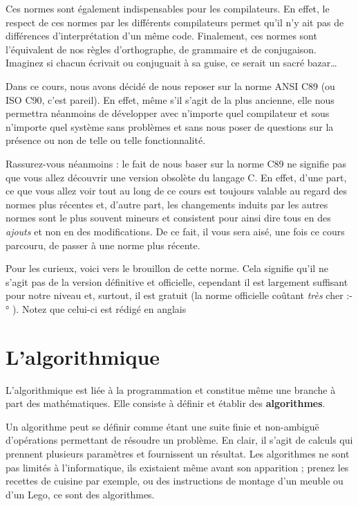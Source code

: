 Ces normes sont également indispensables pour les compilateurs. En
effet, le respect de ces normes par les différents compilateurs permet
qu'il n'y ait pas de différences d'interprétation d'un même code.
Finalement, ces normes sont l'équivalent de nos règles d'orthographe, de
grammaire et de conjugaison. Imaginez si chacun écrivait ou conjuguait à
sa guise, ce serait un sacré bazar\ldots{}

Dans ce cours, nous avons décidé de nous reposer sur la norme ANSI C89
(ou ISO C90, c'est pareil). En effet, même s'il s'agit de la plus
ancienne, elle nous permettra néanmoins de développer avec n'importe
quel compilateur et sous n'importe quel système sans problèmes et sans
nous poser de questions sur la présence ou non de telle ou telle
fonctionnalité.

Rassurez-vous néanmoins : le fait de nous baser sur la norme C89 ne
signifie pas que vous allez découvrir une version obsolète du langage C.
En effet, d'une part, ce que vous allez voir tout au long de ce cours
est toujours valable au regard des normes plus récentes et, d'autre
part, les changements induits par les autres normes sont le plus souvent
mineurs et consistent pour ainsi dire tous en des \emph{ajouts} et non
en des modifications. De ce fait, il vous sera aisé, une fois ce cours
parcouru, de passer à une norme plus récente.

\begin{infobox} Pour les curieux, voici
     vers le
    brouillon de cette norme. Cela signifie qu'il ne s'agit pas de la
    version définitive et officielle, cependant il est largement
    suffisant pour notre niveau et, surtout, il est gratuit (la norme
    officielle coûtant \emph{très} cher :-° ). Notez que celui-ci est
    rédigé en anglais
\end{infobox}

\section{L’algorithmique}
\label{l-algorithmique}

L'algorithmique est liée à la programmation et constitue même une
branche à part des mathématiques.  Elle consiste à définir et établir
des \textbf{algorithmes}.

Un algorithme peut se définir comme étant une suite finie et
non-ambiguë d'opérations permettant de résoudre un problème. En clair,
il s'agit de calculs qui prennent plusieurs paramètres et fournissent
un résultat.  Les algorithmes ne sont pas limités à l'informatique,
ils existaient même avant son apparition ; prenez les recettes de
cuisine par exemple, ou des instructions de montage d'un meuble ou
d'un Lego, ce sont des algorithmes.

